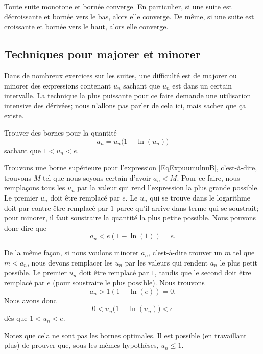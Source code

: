 \begin{proposition}		\label{Propsuiteborncv}
Toute suite monotone et bornée converge. En particulier, si une suite est décroissante et bornée vers le bas, alors elle converge. De même, si une suite est  croissante et bornée vers le haut, alors elle converge.
\end{proposition}

\subsection{Techniques pour majorer et minorer}

Dans de nombreux exercices sur les suites, une difficulté est de majorer ou minorer des expressions contenant $u_n$ sachant que $u_n$ est dans un certain intervalle. La technique la plus puissante pour ce faire demande une utilisation intensive des dérivées; nous n'allons pas parler de cela ici, mais sachez que ça existe.

\begin{example}
	Trouver	des bornes pour la quantité
	\begin{equation}		\label{EqExpuumulnuB}
		a_n=u_n\big( 1-\ln(u_n) \big)
	\end{equation}
	sachant que $1<u_n<e$.

	Trouvons une borne supérieure pour l'expression \eqref{EqExpuumulnuB}, c'est-à-dire, trouvons $M$ tel que nous soyons certain d'avoir $a_n<M$. Pour ce faire, nous remplaçons tous les $u_n$ par la valeur qui rend l'expression la plus grande possible. Le premier $u_n$ doit être remplacé par $e$. Le $u_n$ qui se trouve dans le logarithme doit par contre être remplacé par $1$ parce qu'il arrive dans terme qui se soustrait; pour minorer, il faut soustraire la quantité la plus petite possible. Nous pouvons donc dire que
	\begin{equation}
		a_n<e(1-\ln(1))=e.
	\end{equation}

	De la même façon, si nous voulons minorer $a_n$, c'est-à-dire trouver un $m$ tel que $m<a_n$, nous devons remplacer les $u_n$ par les valeurs qui rendent $a_n$ le plus petit possible. Le premier $u_n$ doit être remplacé par $1$, tandis que le second doit être remplacé par $e$ (pour soustraire le plus possible). Nous trouvons
	\begin{equation}
		a_n>1(1-\ln(e))=0.
	\end{equation}
	Nous avons donc
	\begin{equation}
		0<u_n\big( 1-\ln(u_n) \big)<e
	\end{equation}
	dès que $1<u_n<e$.

	Notez que cela ne sont pas les bornes optimales. Il est possible (en travaillant plus) de prouver que, sous les mêmes hypothèses, $u_n\leq 1$.
\end{example}


